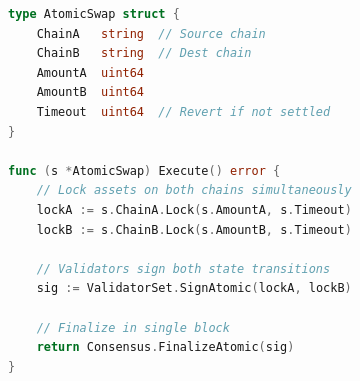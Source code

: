 \begin{lstlisting}[language=Go]
type AtomicSwap struct {
    ChainA   string  // Source chain
    ChainB   string  // Dest chain
    AmountA  uint64
    AmountB  uint64
    Timeout  uint64  // Revert if not settled
}

func (s *AtomicSwap) Execute() error {
    // Lock assets on both chains simultaneously
    lockA := s.ChainA.Lock(s.AmountA, s.Timeout)
    lockB := s.ChainB.Lock(s.AmountB, s.Timeout)
    
    // Validators sign both state transitions
    sig := ValidatorSet.SignAtomic(lockA, lockB)
    
    // Finalize in single block
    return Consensus.FinalizeAtomic(sig)
}
\end{lstlisting}

